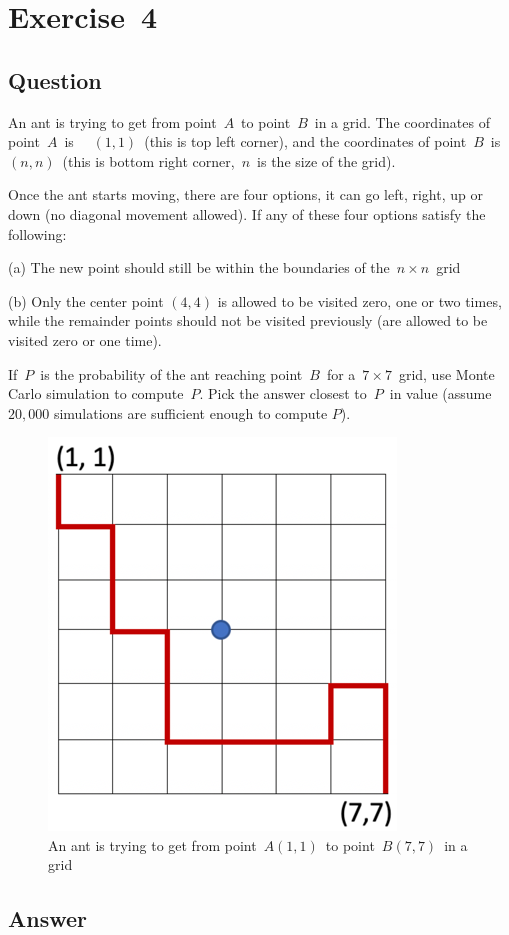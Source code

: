 \documentclass[a4paper, utf8]{ctexart}
\begin{document}
	\section{Exercise\ 4}
	
	\subsection{Question}
	
	An ant is trying to get from point $A$ to point $B$ in a grid. The coordinates of point $A$ is \  $(1,1)$ (this is top left corner), and the coordinates of point $B$ is $(n,n)$ (this is bottom right corner, $n$ is the size of the grid).
	
	Once the ant starts moving, there are four options, it can go left, right, up or down (no diagonal movement allowed). If any of these four options satisfy the following:
	
	(a) The new point should still be within the boundaries of the $n\times n$ grid
	
	(b) Only the center point $(4, 4)$ is allowed to be visited zero, one or two times, while the remainder points should not be visited previously (are allowed to be visited zero or one time).
	
	If $P$ is the probability of the ant reaching point $B$ for a $7\times7$ grid, use Monte Carlo simulation to compute $P$. Pick the answer closest to $P$ in value (assume $20,000$ simulations are sufficient enough to compute $P$).
	
	\begin{figure}[htbp]
		\centering
		\includegraphics[width=.4\textwidth]{./figure/figure2.png}
		\caption{An ant is trying to get from point $A(1,1)$ to point $B(7,7)$ in a grid}
	\end{figure}
	
	\subsection{Answer}
	
\end{document}
